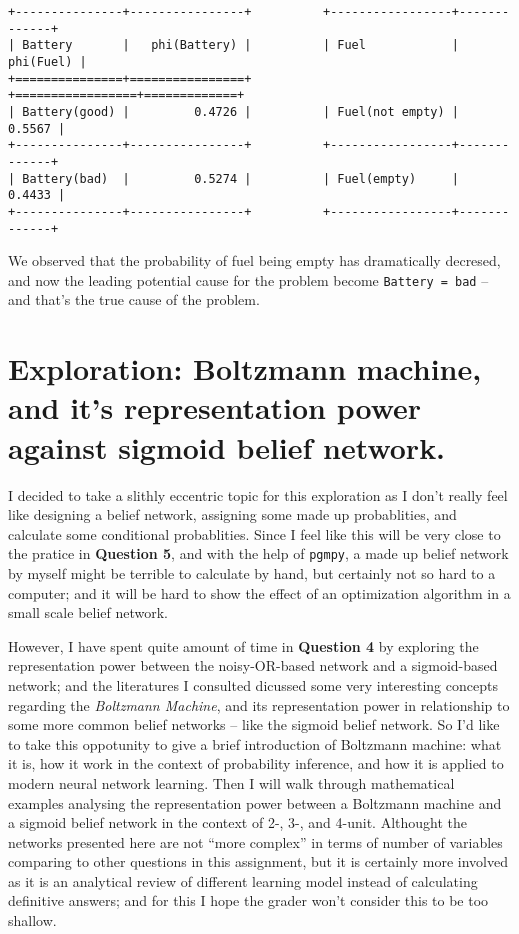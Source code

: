 \documentclass[11pt]{article}
\newcommand{\ilc}{\texttt}
\begin{document}
\begin{lstlisting}
+---------------+----------------+          +-----------------+-------------+
| Battery       |   phi(Battery) |          | Fuel            |   phi(Fuel) |
+===============+================+          +=================+=============+
| Battery(good) |         0.4726 |          | Fuel(not empty) |      0.5567 |
+---------------+----------------+          +-----------------+-------------+
| Battery(bad)  |         0.5274 |          | Fuel(empty)     |      0.4433 |
+---------------+----------------+          +-----------------+-------------+
\end{lstlisting}

We observed that the probability of fuel being empty has dramatically decresed, and now the leading potential cause for the problem become \ilc{Battery = bad} -- and that's the true cause of the problem.

\section*{Exploration: Boltzmann machine, and it's representation power against sigmoid belief network.}

I decided to take a slithly eccentric topic for this exploration as I don't really feel like designing a belief network, assigning some made up probablities, and calculate some conditional probablities. Since I feel like this will be very close to the pratice in \textbf{Question 5}, and with the help of \ilc{pgmpy}, a made up belief network by myself might be terrible to calculate by hand, but certainly not so hard to a computer; and it will be hard to show the effect of an optimization algorithm in a small scale belief network.

However, I have spent quite amount of time in \textbf{Question 4} by exploring the representation power between the noisy-OR-based network and a sigmoid-based network; and the literatures I consulted dicussed some very interesting concepts regarding the \textit{Boltzmann Machine}, and its representation power in relationship to some more common belief networks -- like the sigmoid belief network. So I'd like to take this oppotunity to give a brief introduction of Boltzmann machine: what it is, how it work in the context of probability inference, and how it is applied to modern neural network learning. Then I will walk through mathematical examples analysing the representation power between a Boltzmann machine and a sigmoid belief network in the context of 2-, 3-, and 4-unit. Althought the networks presented here are not ``more complex'' in terms of number of variables comparing to other questions in this assignment, but it is certainly more involved as it is an analytical review of different learning model instead of calculating definitive answers; and for this I hope the grader won't consider this to be too shallow.\newline
\end{document}
